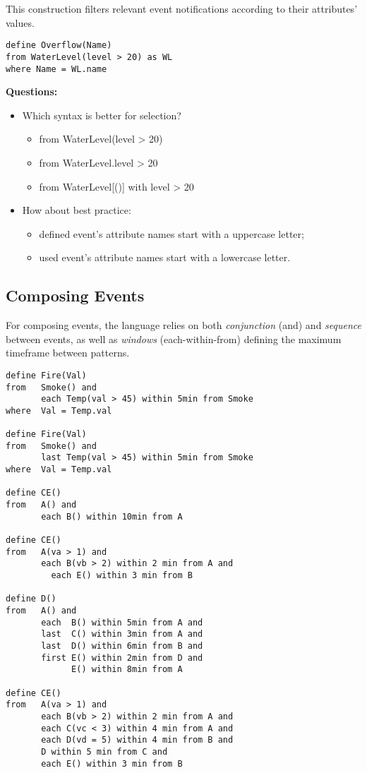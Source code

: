 This construction filters relevant event notifications according to their attributes' values.

\begin{lstlisting}[language=iotdsl]
define Overflow(Name)
from WaterLevel(level > 20) as WL
where Name = WL.name
\end{lstlisting}

\medskip
\noindent
\textbf{Questions:}
\begin{itemize}
	\item Which syntax is better for selection?
	\begin{itemize}
		\item from WaterLevel(level > 20)
		\item from WaterLevel.level > 20
		\item from WaterLevel[()] with level > 20
	\end{itemize}
	\item How about best practice: 
	\begin{itemize}
		\item defined event's attribute names start with a uppercase letter;
		\item used event's attribute names start with a lowercase letter.
	\end{itemize}
\end{itemize}

\subsection{Composing Events}
\label{sec:ComposingEvents}

For composing events, the language relies on both \emph{conjunction} (\textsf{and}) and \emph{sequence} between events, as well as \emph{windows} (\textsf{each-within-from}) defining the maximum timeframe between patterns.

\begin{lstlisting}[language=iotdsl]
define Fire(Val)
from   Smoke() and
       each Temp(val > 45) within 5min from Smoke
where  Val = Temp.val

define Fire(Val)
from   Smoke() and
       last Temp(val > 45) within 5min from Smoke
where  Val = Temp.val

define CE()
from   A() and 
       each B() within 10min from A

define CE()
from   A(va > 1) and 
       each B(vb > 2) within 2 min from A and 
		 each E() within 3 min from B

define D()
from   A() and 
       each  B() within 5min from A and
       last  C() within 3min from A and
       last  D() within 6min from B and
       first E() within 2min from D and
             E() within 8min from A

define CE()
from   A(va > 1) and 
       each B(vb > 2) within 2 min from A and 
       each C(vc < 3) within 4 min from A and 
       each D(vd = 5) within 4 min from B and 
       D within 5 min from C and 
       each E() within 3 min from B
\end{lstlisting}

